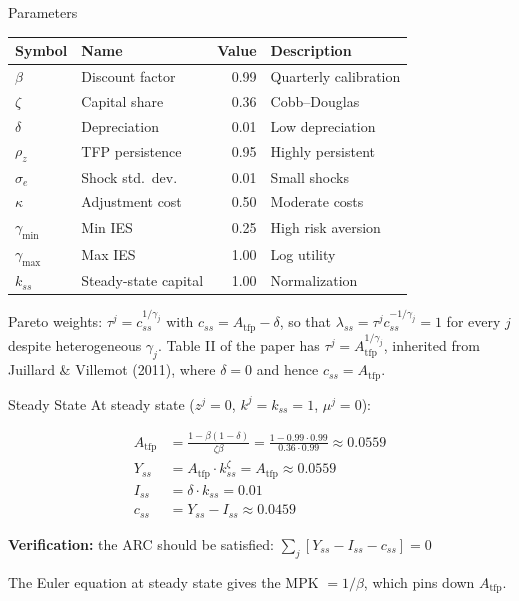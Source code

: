 \documentclass[aspectratio=169,11pt]{beamer}
\begin{document}
\begin{frame}{Parameters}
\begin{center}
\begin{tabular}{llrl}
\toprule
\textbf{Symbol} & \textbf{Name} & \textbf{Value} & \textbf{Description} \\
\midrule
$\beta$ & Discount factor & 0.99 & Quarterly calibration \\
$\zeta$ & Capital share & 0.36 & Cobb--Douglas \\
$\delta$ & Depreciation & 0.01 & Low depreciation \\
$\rho_z$ & TFP persistence & 0.95 & Highly persistent \\
$\sigma_e$ & Shock std.\ dev. & 0.01 & Small shocks \\
$\kappa$ & Adjustment cost & 0.50 & Moderate costs \\
$\gamma_{\min}$ & Min IES & 0.25 & High risk aversion \\
$\gamma_{\max}$ & Max IES & 1.00 & Log utility \\
$k_{ss}$ & Steady-state capital & 1.00 & Normalization \\
\bottomrule
\end{tabular}
\end{center}

\vspace{0.2em}
{\scriptsize Pareto weights: $\tau^j = c_{ss}^{1/\gamma_j}$ with $c_{ss} = A_{\text{tfp}} - \delta$, so that $\lambda_{ss} = \tau^j c_{ss}^{-1/\gamma_j} = 1$ for every $j$ despite heterogeneous $\gamma_j$. Table II of the paper has $\tau^j = A_{\text{tfp}}^{1/\gamma_j}$, inherited from Juillard \& Villemot (2011), where $\delta = 0$ and hence $c_{ss} = A_{\text{tfp}}$.}
\end{frame}

\begin{frame}{Steady State}
At steady state ($z^j = 0$, $k^j = k_{ss} = 1$, $\mu^j = 0$):

\vspace{0.3em}
\begin{align*}
A_{\text{tfp}} &= \frac{1 - \beta(1-\delta)}{\zeta\beta} = \frac{1 - 0.99 \cdot 0.99}{0.36 \cdot 0.99} \approx 0.0559 \\[4pt]
Y_{ss} &= A_{\text{tfp}} \cdot k_{ss}^\zeta = A_{\text{tfp}} \approx 0.0559 \\[4pt]
I_{ss} &= \delta \cdot k_{ss} = 0.01 \\[4pt]
c_{ss} &= Y_{ss} - I_{ss} \approx 0.0459
\end{align*}

\vspace{0.3em}
\textbf{Verification:} the ARC should be satisfied: $\sum_j [Y_{ss} - I_{ss} - c_{ss}] = 0$ \checkmark

\vspace{0.3em}
{\small The Euler equation at steady state gives the MPK $= 1/\beta$, which pins down $A_{\text{tfp}}$.}
\end{frame}
\end{document}
